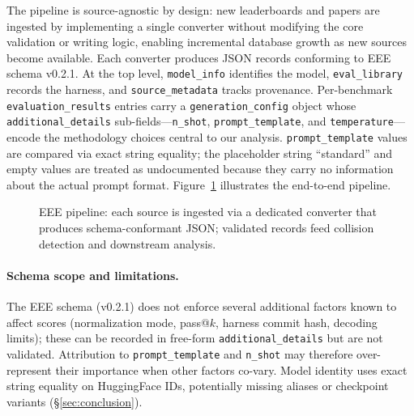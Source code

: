 \documentclass[11pt]{article}
\begin{document}
The pipeline is source-agnostic by design: new leaderboards and
papers are ingested by implementing a single converter without
modifying the core validation or writing logic, enabling incremental
database growth as new sources become available.
Each converter produces JSON records conforming to EEE schema v0.2.1.
At the top level, \texttt{model\_info} identifies the model,
\texttt{eval\_library} records the harness, and
\texttt{source\_metadata} tracks provenance.
Per-benchmark \texttt{evaluation\_results} entries carry a
\texttt{generation\_config} object whose
\texttt{additional\_details} sub-fields---\texttt{n\_shot},
\texttt{prompt\_template}, and \texttt{temperature}---encode
the methodology choices central to our analysis.
\texttt{prompt\_template} values are compared via exact string
equality; the placeholder string ``standard'' and empty values
are treated as undocumented because they carry no
information about the actual prompt format.
Figure~\ref{fig:pipeline} illustrates the end-to-end pipeline.

\begin{figure}[t]
\centering
{}
\caption{EEE pipeline: each source is ingested via a dedicated converter
that produces schema-conformant JSON; validated records feed collision
detection and downstream analysis.}
\label{fig:pipeline}
\end{figure}

\paragraph{Schema scope and limitations.}
The EEE schema (v0.2.1) does not enforce several additional factors
known to affect scores (normalization mode, pass@$k$, harness
commit hash, decoding limits); these can be recorded in free-form
\texttt{additional\_details} but are not validated.
Attribution to \texttt{prompt\_template} and \texttt{n\_shot} may
therefore over-represent their importance when other factors co-vary.
Model identity uses exact string equality on HuggingFace IDs,
potentially missing aliases or checkpoint variants (\S\ref{sec:conclusion}).
\end{document}
